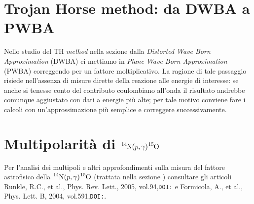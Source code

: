 \section{Trojan Horse method: da DWBA a PWBA}\label{compl-dwba-pwba}
Nello studio del TH \textit{method} nella sezione  dalla \textit{Distorted Wave Born Approximation} (DWBA) ci mettiamo in \textit{Plane Wave Born Approximation} (PWBA) correggendo per un fattore moltiplicativo. La ragione di tale passaggio risiede nell'assenza di misure dirette della reazione alle energie di interesse: se anche si tenesse conto del contributo coulombiano all'onda il risultato andrebbe comunque aggiustato con dati a energie più alte; per tale motivo conviene fare i calcoli con un'approssimazione più semplice e correggere successivamente.

\section{Multipolarità di $\ce{^{14}N}(p,\gamma)\ce{^{15}O}$}\label{compl-multipoli}
Per l'analisi dei multipoli e altri approfondimenti sulla misura del fattore astrofisico della $\ce{^{14}N}(p,\gamma)\ce{^{15}O}$ (trattata nella sezione ) consultare gli articoli Runkle, R.C., et al., Phys. Rev. Lett., 2005, vol.94,\texttt{DOI:} e Formicola, A., et al., Phys. Lett. B, 2004, vol.591,\texttt{DOI:}.